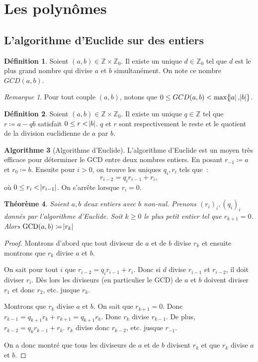 \documentclass{article}
\DeclareMathOperator{\GCD}{GCD}
\newcommand{\Z}{\mathbb Z}
\newtheorem{thm}{Théorème}[section]
\theoremstyle{definition}
\newtheorem{alg}[thm]{Algorithme}
\newtheorem{déf}[thm]{Définition}
\theoremstyle{remark}
\newtheorem*{rmq}{Remarque}
\begin{document}
\newpage
\section{Les polynômes}
	\subsection{L'algorithme d'Euclide sur des entiers}
		\begin{déf} Soient $(a, b) \in \Z \times \Z_0$. Il existe un unique $d \in \Z_0$ tel que $d$ est le plus grand nombre qui divise $a$ et $b$ simultanément.
		On note ce nombre $GCD(a, b)$.\end{déf}

		\begin{rmq} Pour tout couple $(a, b)$, notons que $0 \leq GCD(a, b) < \max\{\abs a, \abs b\}$. \end{rmq}

		\begin{déf} Soient $(a, b) \in \Z \times \Z_0$. Il existe un unique $q \in \Z$ tel que $r \coloneqq a - qb$ satisfait $0 \leq r < \abs b$. $q$ et $r$ sont
		respectivement le reste et le quotient de la division euclidienne de $a$ par $b$. \end{déf}

		\begin{alg}[Algorithme d'Euclide]\label{algEuclide} L'algorithme d'Euclide est un moyen très efficace pour déterminer le GCD entre deux nombres entiers. En posant
		$r_{-1} \coloneqq a$ et $r_0 \coloneqq b$. Ensuite pour $i > 0$, on trouve les uniques $q_i, r_i$ tels que~: \[r_{i-2} = q_ir_{i-1} + r_i,\] où
		$0 \leq r_i < \abs{r_{i-1}}$. On s'arrête lorsque $r_i = 0$. \end{alg}

		\begin{thm} Soient $a, b$ deux entiers avec $b$ non-nul. Prenons $(r_i)_i, (q_i)_i$ donnés par l'algorithme d'Euclide. Soit $k \geq 0$ le plus petit entier tel que
		$r_{k+1} = 0$. Alors $\GCD(a, b) \coloneqq \abs {r_k}$\end{thm}

		\begin{proof} Montrons d'abord que tout diviseur de $a$ et de $b$ divise $r_k$ et ensuite montrons que $r_k$ divise $a$ et $b$.

		On sait pour tout $i$ que $r_{i-2} = q_ir_{i-1} + r_i$. Donc si $d$ divise $r_{i-1}$ et $r_{i-2}$, il doit diviser $r_i$. Dès lors les diviseurs (en particulier
		le GCD) de $a$ et $b$ doivent diviser $r_1$ et donc $r_2$, etc. jusque $r_k$.

		Montrons que $r_k$ divise $a$ et $b$. On sait que $r_{k+1} = 0$. Donc $r_{k-1} = q_{k+1}r_k + r_{k+1} = q_{k+1}r_k$. Donc $r_k$ divise $r_{k-1}$. De plus,
		$r_{k-2} = q_kr_{k-1} + r_k$. $r_k$ divise donc $r_{k-2}$, etc. jusque $r_{-1}$.

		On a donc montré que tous les diviseurs de $a$ et de $b$ divisent $r_k$ et que $r_k$ divise $a$ et $b$. \end{proof}
\end{document}
